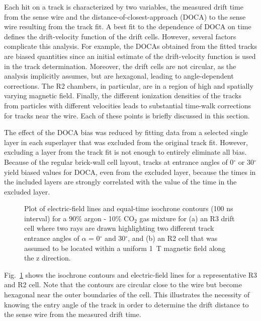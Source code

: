 \hskip 0.15in
Each hit on a track is characterized by two variables, the measured drift 
time from the sense wire and the distance-of-closest-approach (DOCA) to the 
sense wire resulting from the track fit.  
A best fit to the dependence of DOCA on time defines the 
drift-velocity function of the drift cells. However, several factors 
complicate this analysis. For example, the DOCAs obtained from the fitted 
tracks are biased quantities since an initial estimate of the drift-velocity 
function is used in the track determination.  Moreover, the drift cells are 
not circular, as the analysis implicitly assumes, but are hexagonal, leading 
to angle-dependent corrections.   The R2 chambers, in particular, are in a 
region of high and spatially varying magnetic field.  Finally, the different 
ionization densities of the tracks from particles with different velocities 
leads to substantial time-walk corrections for tracks near the wire.  Each of 
these points is briefly discussed in this section.

The effect of the DOCA bias was reduced by fitting data from a selected single
layer in each superlayer that was excluded from the original track fit.  
However, excluding a layer from the track fit is not enough to entirely 
eliminate all bias.  Because of the regular brick-wall cell layout, tracks at 
entrance angles of 0$^{\circ}$ or 30$^{\circ}$ yield biased values for DOCA, 
even from the excluded layer, because the times in the included layers are 
strongly correlated with the value of the time in the excluded layer.

\begin{figure}[htpb]
\vspace{4.5cm} 
\caption{\small{Plot of electric-field lines and equal-time isochrone contours
(100 ns interval) for a 90$\%$ argon - 10$\%$ CO$_2$ gas mixture for (a) an R3
drift cell where two rays are drawn highlighting two different track entrance 
angles of $\alpha$ = 0$^{\circ}$ and 30$^{\circ}$, and (b) an R2 cell that 
was assumed to be located within a uniform 1~T magnetic field along the z 
direction.}}
\label{garfield}
\end{figure}

Fig.~\ref{garfield} shows the isochrone contours and electric-field lines for 
a representative R3 and R2 cell.  Note that the contours are circular close 
to the wire but become hexagonal near the outer boundaries of the cell.  This 
illustrates the necessity of knowing the entry angle of the track in order to 
determine the drift distance to the sense wire from the measured drift time.

